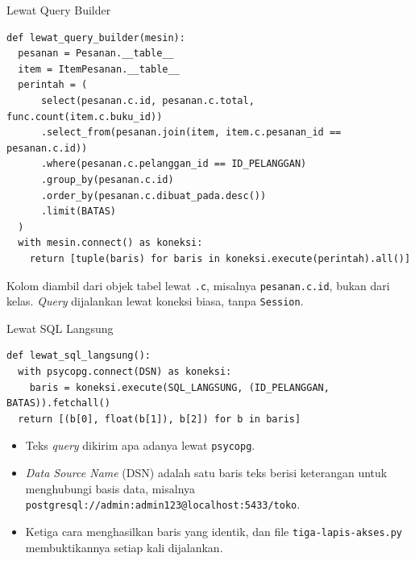 \documentclass[aspectratio=169, table, 12pt]{beamer}
\begin{document}
\begin{frame}[fragile]{{\Large Lewat Query Builder}}
  \vspace{2pt}
\begin{lstlisting}[style=PythonStyle]
def lewat_query_builder(mesin):
  pesanan = Pesanan.__table__
  item = ItemPesanan.__table__
  perintah = (
      select(pesanan.c.id, pesanan.c.total, func.count(item.c.buku_id))
      .select_from(pesanan.join(item, item.c.pesanan_id == pesanan.c.id))
      .where(pesanan.c.pelanggan_id == ID_PELANGGAN)
      .group_by(pesanan.c.id)
      .order_by(pesanan.c.dibuat_pada.desc())
      .limit(BATAS)
  )
  with mesin.connect() as koneksi:
    return [tuple(baris) for baris in koneksi.execute(perintah).all()]
\end{lstlisting}

  \vspace{2pt}
  {\footnotesize Kolom diambil dari objek tabel lewat \texttt{.c}, misalnya
  \texttt{pesanan.c.id}, bukan dari kelas. \textit{Query} dijalankan lewat koneksi
  biasa, tanpa \texttt{Session}.}
\end{frame}

\begin{frame}[fragile]{{\Large Lewat SQL Langsung}}
  \vspace{2pt}
\begin{lstlisting}[style=PythonStyle]
def lewat_sql_langsung():
  with psycopg.connect(DSN) as koneksi:
    baris = koneksi.execute(SQL_LANGSUNG, (ID_PELANGGAN, BATAS)).fetchall()
  return [(b[0], float(b[1]), b[2]) for b in baris]
\end{lstlisting}

  \vspace{4pt}
  \begin{itemize}
    \item Teks \textit{query} dikirim apa adanya lewat \texttt{psycopg}.
    \item \textit{Data Source Name} (DSN) adalah satu baris teks berisi
          keterangan untuk menghubungi basis data, misalnya
          \texttt{postgresql://admin:admin123@localhost:5433/toko}.
    \item Ketiga cara menghasilkan baris yang identik, dan file
          \texttt{tiga-lapis-akses.py} membuktikannya setiap kali dijalankan.
  \end{itemize}
\end{frame}
\end{document}
